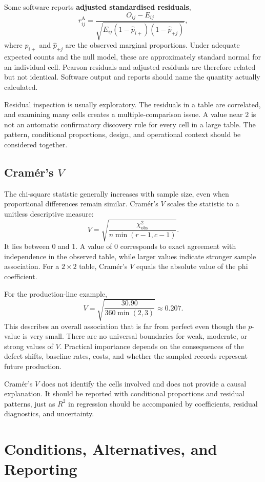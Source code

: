 Some software reports \textbf{adjusted standardised residuals},
\[
r^{\mathrm{A}}_{ij}
=\frac{O_{ij}-E_{ij}}
{\sqrt{E_{ij}(1-\hat p_{i+})(1-\hat p_{+j})}},
\]
where $\hat p_{i+}$ and $\hat p_{+j}$ are the observed marginal proportions. Under adequate expected counts and the null model, these are approximately standard normal for an individual cell. Pearson residuals and adjusted residuals are therefore related but not identical. Software output and reports should name the quantity actually calculated.

Residual inspection is usually exploratory. The residuals in a table are correlated, and examining many cells creates a multiple-comparison issue. A value near $2$ is not an automatic confirmatory discovery rule for every cell in a large table. The pattern, conditional proportions, design, and operational context should be considered together.

\subsection{Cram\'er's $V$}

The chi-square statistic generally increases with sample size, even when proportional differences remain similar. Cram\'er's $V$ scales the statistic to a unitless descriptive measure:
\[
V
=\sqrt{
\frac{\chi^2_{\mathrm{obs}}}
{n\min(r-1,c-1)}
}.
\]
It lies between 0 and 1. A value of 0 corresponds to exact agreement with independence in the observed table, while larger values indicate stronger sample association. For a $2\times2$ table, Cram\'er's $V$ equals the absolute value of the phi coefficient.

For the production-line example,
\[
V
=\sqrt{\frac{30.90}{360\min(2,3)}}
\approx0.207.
\]
This describes an overall association that is far from perfect even though the $p$-value is very small. There are no universal boundaries for weak, moderate, or strong values of $V$. Practical importance depends on the consequences of the defect shifts, baseline rates, costs, and whether the sampled records represent future production.

Cram\'er's $V$ does not identify the cells involved and does not provide a causal explanation. It should be reported with conditional proportions and residual patterns, just as $R^2$ in regression should be accompanied by coefficients, residual diagnostics, and uncertainty.

\section{Conditions, Alternatives, and Reporting}
\label{sec:chi-square-reporting}

